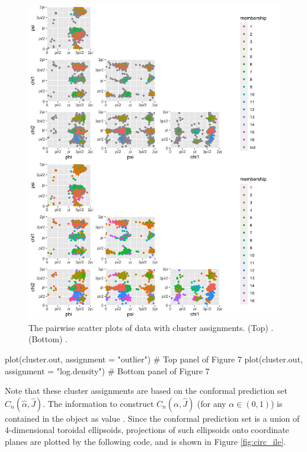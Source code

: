 \begin{figure}[p]
     \centering
     \includegraphics[scale = 0.165]{cluster_ile.png}
     \caption{The pairwise scatter plots of  data with cluster assignments. (Top) . (Bottom) .}
     \label{fig:cluster_ile}
\end{figure}


\begin{example}
plot(cluster.out, assignment = "outlier")     # Top panel of Figure 7
plot(cluster.out, assignment = "log.density") # Bottom panel of Figure 7
\end{example}


Note that these cluster assignments are based on the conformal prediction set $C_n(\hat\alpha,\hat{J})$. The information to construct $C_n(\alpha, \hat{J})$ (for any $\alpha \in (0,1)$) is contained in the object  as value . Since the conformal prediction set is a union of 4-dimensional toroidal ellipsoids, projections of such ellipsoids onto coordinate planes are plotted by the following code, and is shown in Figure \ref{fig:circ_ile}.
 

